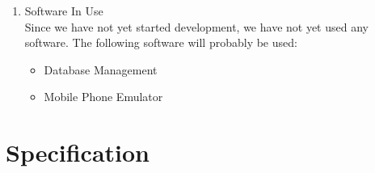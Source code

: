 \documentclass[10pt]{article}
\begin{document}
\begin{enumerate}
\begin{itemize}
    \item {GitHub} \\

    GitHub is an online software development platform. It\textquotesingle s used for storing, tracking and collaborating on software projects. It makes it easy for our team to share code files and make some issues regarding the code

  \end{itemize}
  
  
  \item {Software In Use} \\
  Since we have not yet started development, we have not yet used any software. The following software will probably be used:

  \begin{itemize}
    \item Database Management

    \item Mobile Phone Emulator

  \end{itemize}
\end{enumerate}

\section{Specification}
\end{document}
